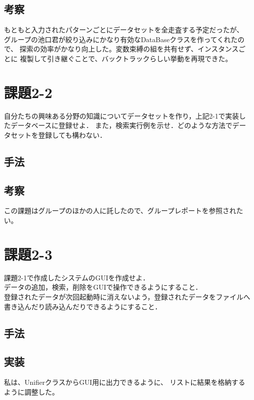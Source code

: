 \documentclass{jarticle}
\begin{document}
\subsection{考察}
もともと入力されたパターンごとにデータセットを全走査する予定だったが、
グループの池口君が絞り込みにかなり有効なDataBaseクラスを作ってくれたので、
探索の効率がかなり向上した。変数束縛の組を共有せず、インスタンスごとに
複製して引き継ぐことで、バックトラックらしい挙動を再現できた。

\section{課題2-2}
\begin{screen}
    自分たちの興味ある分野の知識についてデータセットを作り，上記2-1で実装したデータベースに登録せよ．
    また，検索実行例を示せ．どのような方法でデータセットを登録しても構わない．
\end{screen}
\subsection{手法}

\subsection{考察}
この課題はグループのほかの人に託したので、グループレポートを参照されたい。

\section{課題2-3}
\begin{screen}
    課題2-1で作成したシステムのGUIを作成せよ．
    \\ データの追加，検索，削除をGUIで操作できるようにすること．
    \\ 登録されたデータが次回起動時に消えないよう，登録されたデータをファイルへ書き込んだり読み込んだりできるようにすること．
\end{screen}
\subsection{手法}

\subsection{実装}
私は、UnifierクラスからGUI用に出力できるように、
リストに結果を格納するように調整した。
\end{document}
